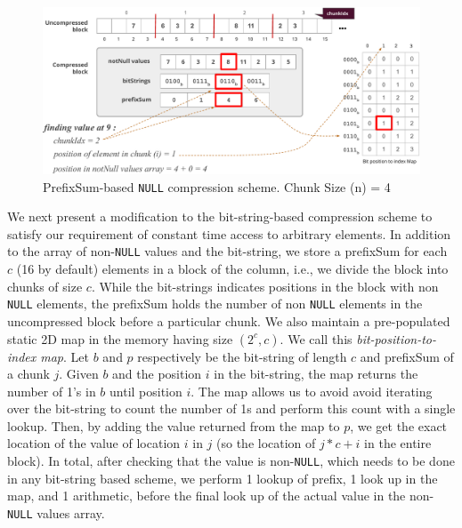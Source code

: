 
\begin{figure}
	\hfill\includegraphics[scale=0.70]{img/null2}\hspace*{\fill}
	\captionsetup{justification=centering}
	\caption{PrefixSum-based \texttt{NULL} compression scheme. Chunk Size (n) = 4}
	\label{fig:null2}
\end{figure}

We next present a modification to the bit-string-based compression scheme to satisfy our requirement of constant time access to arbitrary elements. In addition to the array of non-\texttt{NULL} values and the bit-string, we store a prefixSum for each $c$ (16 by default) elements in a block of the column, i.e., we divide the block into chunks of size $c$. While the bit-strings indicates positions in the block with non \texttt{NULL} elements, the prefixSum holds the number of non \texttt{NULL} elements in the uncompressed block before a particular chunk. We also maintain a pre-populated static 2D map in the memory having size $(2^c, c)$. We call this \emph{bit-position-to-index map}. Let $b$ and $p$ respectively be the bit-string of length $c$ and prefixSum of a chunk $j$. Given $b$ and the position $i$ in the bit-string, the map returns the number of 1's in $b$ until position $i$. The map  allows us to avoid avoid iterating over the bit-string to count the number of 1s and perform this count with a single lookup. Then, by adding the value returned from the map to $p$, we get the exact location of the value of location $i$ in $j$ (so the location of $j*c + i$ in the entire block). In total, after checking that the value is non-\texttt{NULL}, which needs to be done in any bit-string based scheme, we perform 1 lookup of prefix, 1 look up in the map, and 1 arithmetic, before the final look up of the actual value in the non-\texttt{NULL} values array.

